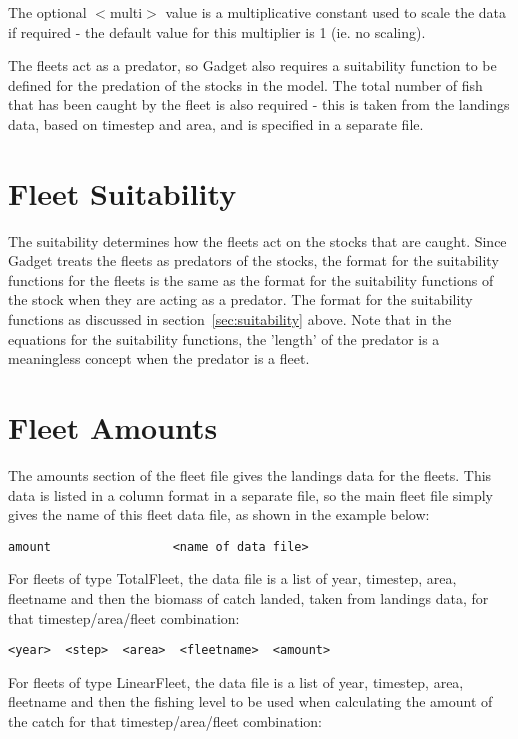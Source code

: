 \documentclass[10pt,twoside]{book}
\begin{document}
The optional $<$multi$>$ value is a multiplicative constant used to scale the data if required - the default value for this multiplier is 1 (ie. no scaling).

\bigskip
The fleets act as a predator, so Gadget also requires a suitability function to be defined for the predation of the stocks in the model.  The total number of fish that has been caught by the fleet is also required - this is taken from the landings data, based on timestep and area, and is specified in a separate file.

\section{Fleet Suitability}\label{sec:fleetsuit}
The suitability determines how the fleets act on the stocks that are caught.  Since Gadget treats the fleets as predators of the stocks, the format for the suitability functions for the fleets is the same as the format for the suitability functions of the stock when they are acting as a predator.  The format for the suitability functions as discussed in section~\ref{sec:suitability} above.  Note that in the equations for the suitability functions, the 'length' of the predator is a meaningless concept when the predator is a fleet.

\section{Fleet Amounts}\label{sec:fleetamount}
The amounts section of the fleet file gives the landings data for the fleets.  This data is listed in a column format in a separate file, so the main fleet file simply gives the name of this fleet data file, as shown in the example below:

{\small\begin{verbatim}
amount                 <name of data file>
\end{verbatim}}

For fleets of type TotalFleet, the data file is a list of year, timestep, area, fleetname and then the biomass of catch landed, taken from landings data, for that timestep/area/fleet combination:

{\small\begin{verbatim}
<year>  <step>  <area>  <fleetname>  <amount>
\end{verbatim}}

For fleets of type LinearFleet, the data file is a list of year, timestep, area, fleetname and then the fishing level to be used when calculating the amount of the catch for that timestep/area/fleet combination:
\end{document}
